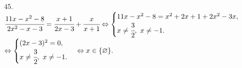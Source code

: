 45. $\cfrac{11x-x^2-8}{2x^2-x-3}=\cfrac{x+1}{2x-3}+\cfrac{x}{x+1}\Leftrightarrow \begin{cases} 11x-x^2-8=x^2+2x+1+2x^2-3x,\\ x\neq\cfrac{3}{2},\ x\neq-1.\end{cases}$\\$
\Leftrightarrow \begin{cases} (2x-3)^2=0,\\ x\neq\cfrac{3}{2},\ x\neq-1.\end{cases}\Leftrightarrow x\in\{\varnothing\}.$\\
